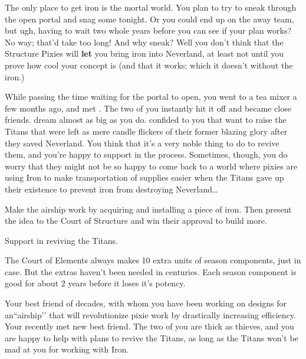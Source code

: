\documentclass[char]{PP}
\begin{document}
The only place to get iron is the mortal world. You plan to try to sneak through the open portal and snag some tonight. Or you could end up on the away team, but ugh, having to wait two whole years before you can see if your plan works? No way; that'd take too long! And why sneak? Well you don't think that the Structure Pixies will \textbf{let} you bring iron into Neverland, at least not until you prove how cool your concept is (and that it works; which it doesn't without the iron.)

While passing the time waiting for the portal to open, you went to a tea mixer a few months ago, and met \cFTitan{}. The two of you instantly hit it off and became close friends. \cFTitan{\They} dream\cFTitan{\plural} almost as big as you do. \cFTitan{} confided to you that \cFTitan{\they} want\cFTitan{\plural} to raise the Titans that were left as mere candle flickers of their former blazing glory after they saved Neverland. You think that it's a very noble thing to do to revive them, and you're happy to support \cFTitan{} in the process. Sometimes, though, you do worry that they might not be so happy to come back to a world where pixies are using Iron to make transportation of supplies easier when the Titans gave up their existence to prevent iron from destroying Neverland\ldots


\begin{itemz}
	\item Make the airship work by acquiring and installing a piece of iron. Then present the idea to the Court of Structure and win their approval to build more.
	\item Support \cFTitan{} in reviving the Titans.
\end{itemz}

\begin{itemz}[Notes]
	\item The Court of Elements always makes 10 extra units of season components, just in case. But the extras haven't been needed in centuries. Each season component is good for about 2 years before it loses it's potency.
\end{itemz}

\begin{contacts}
	\contact{\cMAirship{}} Your best friend of decades, with whom you have been working on designs for an``airship'’ that will revolutionize pixie work by drastically increasing efficiency.
	\contact{\cFTitan{}} Your recently met new best friend. The two of you are thick as thieves, and you are happy to help \cFTitan{\them} with \cFTitan{\their} plans to revive the Titans, as long as the Titans won't be mad at you for working with Iron.
\end{contacts}
\end{document}
